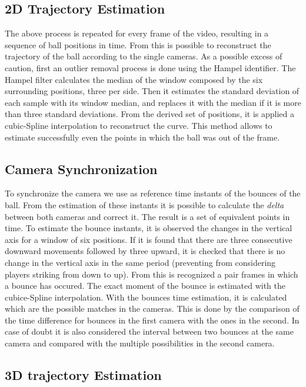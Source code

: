 \documentclass[a4paper]{article}
\begin{document}
\subsection{2D Trajectory Estimation}
The above process is repeated for every frame of the video, resulting in a sequence of ball positions in time. From this is possible to reconstruct the trajectory of the ball according to the single cameras. 
As a possible excess of caution, first an outlier removal process is done using the Hampel identifier. The Hampel filter calculates the median of the window composed by the six surrounding positions, three per side. Then it estimates the standard deviation of each sample with its window median, and replaces it with the median if it is more than three standard deviations. 
From the derived set of positions, it is applied a cubic-Spline interpolation to reconstruct the curve. This method allows to estimate successfully even the points in which the ball was out of the frame.  

\subsection{Camera Synchronization}
To synchronize the camera we use as reference time instants of the bounces of the ball. From the estimation of these instants it is possible to calculate the \textit{delta} between both cameras and correct it. The result is a set of equivalent points in time. 
To estimate the bounce instants, it is observed the changes in the vertical axis for a window of six positions. If it is found that there are three consecutive downward movements followed by three upward, it is checked that there is no change in the vertical axis in the same period (preventing from considering players striking from down to up). From this is recognized a pair frames in which a bounce has occured. The exact moment of the bounce is estimated with the cubice-Spline interpolation.
With the bounces time estimation, it is calculated which are the possible matches in the cameras. This is done by the comparison of the time difference for bounces in the first camera with the ones in the second. In case of doubt it is also considered the interval between two bounces at the same camera and compared with the multiple possibilities in the second camera.  

\subsection{3D trajectory Estimation}
\end{document}
